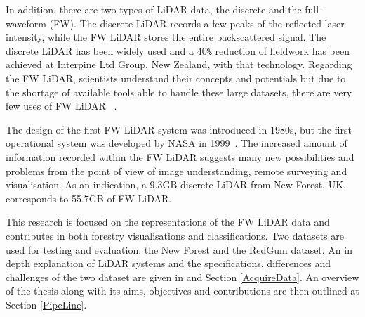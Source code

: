 \documentclass{subfiles}
\begin{document}
	\par In addition, there are two types of LiDAR data, the discrete and the full-waveform (FW). {\color{blue} The discrete LiDAR records a few peaks of the reflected laser intensity, while the FW LiDAR stores the entire backscattered signal}. The discrete LiDAR has been widely used and a 40\verb|%| reduction of fieldwork has been achieved at Interpine Ltd Group, New Zealand, with that technology. Regarding the FW LiDAR, scientists understand their concepts and potentials but due to the shortage of available tools able to handle these large datasets, there are very few uses of FW LiDAR ~\cite{Anderson2015}. 
	
	\par  The design of the first FW LiDAR system was introduced in 1980s, but the first operational system was developed by NASA in 1999~\cite{Chauve2007}. The increased amount of information recorded within the FW LiDAR suggests many new possibilities and problems from the point of view of image understanding, remote surveying and visualisation. As an indication, a 9.3GB discrete LiDAR from New Forest, UK, corresponds to 55.7GB of FW LiDAR. 
	
	{\color{blue} This research is focused on the representations of the FW LiDAR data and contributes in both forestry visualisations and classifications. Two datasets are used for testing and evaluation: the New Forest and the RedGum dataset. An in depth explanation of LiDAR systems and the specifications, differences and challenges of the two dataset are given in  and  Section \ref{AcquireData}. An overview of the thesis along with its aims, objectives and contributions are then outlined at Section \ref{PipeLine}. }
	    
\end{document}
